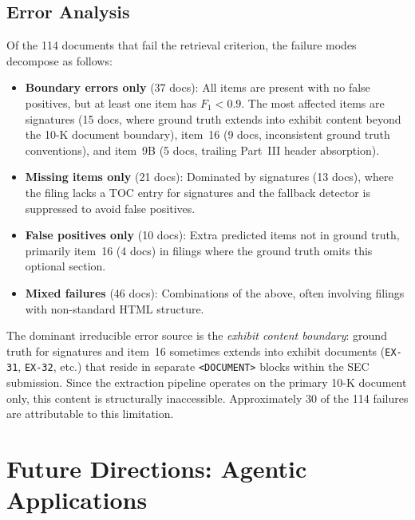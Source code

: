 \documentclass[12pt,letterpaper,oneside]{article}
\begin{document}
\subsection{Error Analysis}

Of the 114 documents that fail the retrieval criterion, the failure
modes decompose as follows:

\begin{itemize}
  \item \textbf{Boundary errors only} (37 docs): All items are
    present with no false positives, but at least one item has
    $F_1 < 0.9$. The most affected items are signatures (15 docs,
    where ground truth extends into exhibit content beyond the
    10-K document boundary), item~16 (9 docs, inconsistent ground
    truth conventions), and item~9B (5 docs, trailing Part~III
    header absorption).

  \item \textbf{Missing items only} (21 docs): Dominated by
    signatures (13 docs), where the filing lacks a TOC entry for
    signatures and the fallback detector is suppressed to avoid
    false positives.

  \item \textbf{False positives only} (10 docs): Extra predicted
    items not in ground truth, primarily item~16 (4 docs) in
    filings where the ground truth omits this optional section.

  \item \textbf{Mixed failures} (46 docs): Combinations of the
    above, often involving filings with non-standard HTML structure.
\end{itemize}

\noindent The dominant irreducible error source is the \emph{exhibit
content boundary}: ground truth for signatures and item~16 sometimes
extends into exhibit documents (\texttt{EX-31}, \texttt{EX-32}, etc.)
that reside in separate \texttt{<DOCUMENT>} blocks within the SEC
submission. Since the extraction pipeline operates on the primary
10-K document only, this content is structurally inaccessible.
Approximately 30 of the 114 failures are attributable to this
limitation.


\section{Future Directions: Agentic Applications}\label{sec:future}
\end{document}
